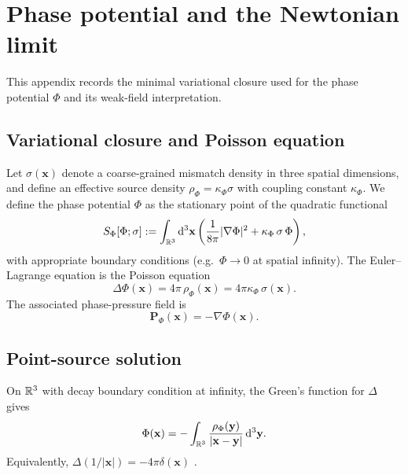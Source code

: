 \section{Phase potential and the Newtonian limit}
\label{app:phase_potential}

This appendix records the minimal variational closure used for the phase potential $\Phi$ and its weak-field interpretation.

\subsection{Variational closure and Poisson equation}

Let $\sigma(\mathbf{x})$ denote a coarse-grained mismatch density in three spatial dimensions, and define an effective source density $\rho_\Phi=\kappa_\Phi\sigma$ with coupling constant $\kappa_\Phi$. We define the phase potential $\Phi$ as the stationary point of the quadratic functional
\begin{equation}
S_\Phi[\Phi;\sigma]
:=\int_{\mathbb{R}^3}\mathrm{d}^3\mathbf{x}\left(\frac{1}{8\pi}|\nabla\Phi|^2+\kappa_\Phi\,\sigma\,\Phi\right),
\label{eq:SPhi_action}
\end{equation}
with appropriate boundary conditions (e.g.\ $\Phi\to 0$ at spatial infinity). The Euler--Lagrange equation is the Poisson equation
\begin{equation}
\Delta \Phi(\mathbf{x}) = 4\pi\,\rho_\Phi(\mathbf{x})
=4\pi\kappa_\Phi\,\sigma(\mathbf{x}).
\end{equation}
The associated phase-pressure field is
\begin{equation}
\mathbf{P}_\Phi(\mathbf{x}) = -\nabla \Phi(\mathbf{x}).
\end{equation}

\subsection{Point-source solution}

On $\mathbb{R}^3$ with decay boundary condition at infinity, the Green's function for $\Delta$ gives
\begin{equation}
\Phi(\mathbf{x}) = -\int_{\mathbb{R}^3} \frac{\rho_\Phi(\mathbf{y})}{|\mathbf{x}-\mathbf{y}|}\,\mathrm{d}^3\mathbf{y}.
\end{equation}
Equivalently, $\Delta(1/|\mathbf{x}|)=-4\pi\delta(\mathbf{x})$ \cite{ArfkenWeberHarris2013}.

